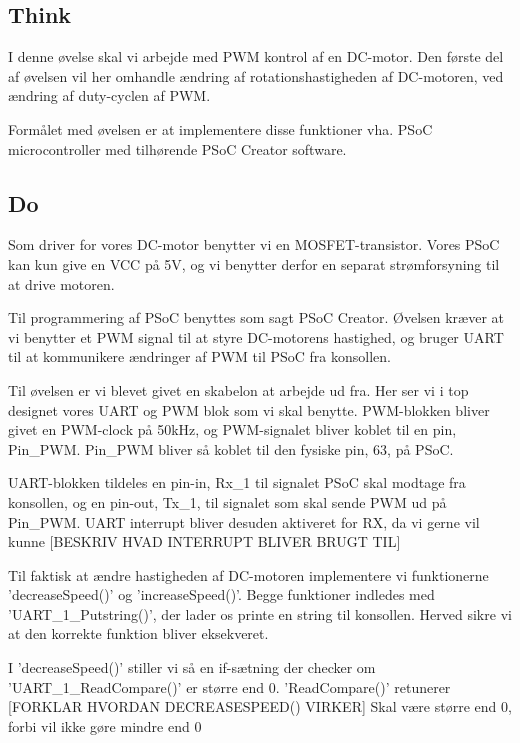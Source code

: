 \documentclass[../main.tex]{subfiles}
\begin{document}
\subsection{Think}
I denne øvelse skal vi arbejde med PWM kontrol af en DC-motor. Den første del af øvelsen vil her omhandle ændring af rotationshastigheden af DC-motoren, ved ændring af duty-cyclen af PWM.

Formålet med øvelsen er at implementere disse funktioner vha. PSoC microcontroller med tilhørende PSoC Creator software. 

\subsection{Do}
Som driver for vores DC-motor benytter vi en MOSFET-transistor. Vores PSoC kan kun give en VCC på 5V, og vi benytter derfor en separat strømforsyning til at drive motoren.


Til programmering af PSoC benyttes som sagt PSoC Creator. Øvelsen kræver at vi benytter et PWM signal til at styre DC-motorens hastighed, og bruger UART til at kommunikere ændringer af PWM til PSoC fra konsollen.

Til øvelsen er vi blevet givet en skabelon at arbejde ud fra. Her ser vi i top designet vores UART og PWM blok som vi skal benytte. PWM-blokken bliver givet en PWM-clock på 50kHz, og PWM-signalet bliver koblet til en pin, Pin\_PWM. Pin\_PWM bliver så koblet til den fysiske pin, 63, på PSoC.


UART-blokken tildeles en pin-in, Rx\_1 til signalet PSoC skal modtage fra konsollen, og en pin-out, Tx\_1, til signalet som skal sende PWM ud på Pin\_PWM. UART interrupt bliver desuden aktiveret for RX, da vi gerne vil kunne [BESKRIV HVAD INTERRUPT BLIVER BRUGT TIL]

Til faktisk at ændre hastigheden af DC-motoren implementere vi funktionerne ’decreaseSpeed()’ og ’increaseSpeed()’. Begge funktioner indledes med ’UART\_1\_Putstring()’, der lader os printe en string til konsollen. Herved sikre vi at den korrekte funktion bliver eksekveret. 


I ’decreaseSpeed()’ stiller vi så en if-sætning der checker om ’UART\_1\_ReadCompare()’ er større end 0. ’ReadCompare()’ retunerer [FORKLAR HVORDAN DECREASESPEED() VIRKER]
Skal være større end 0, forbi vil ikke gøre mindre end 0
\end{document}
